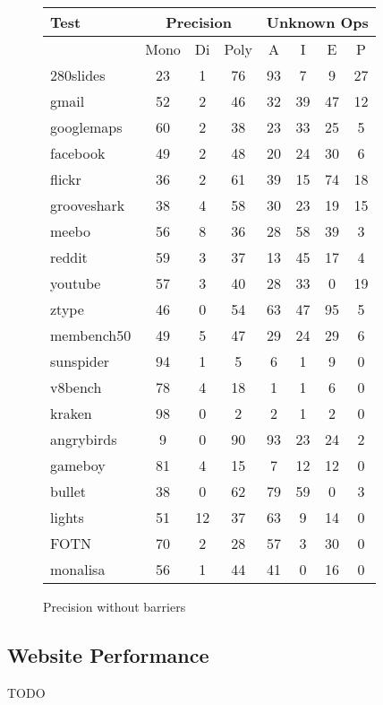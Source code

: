 \begin{figure}
\begin{center}
\begin{tabular}{|l|ccc|cccc|}
\hline
Test & \multicolumn{3}{|c|}{Precision}
     & \multicolumn{4}{|c|}{Unknown Ops} \\
\hline
     & Mono & Di & Poly & A & I & E & P \\
\hline
280slides      & 23 & 1 & 76 & 93 & 7 & 9 & 27 \\
gmail          & 52 & 2 & 46 & 32 & 39 & 47 & 12 \\
googlemaps     & 60 & 2 & 38 & 23 & 33 & 25 & 5 \\
facebook       & 49 & 2 & 48 & 20 & 24 & 30 & 6 \\
flickr         & 36 & 2 & 61 & 39 & 15 & 74 & 18 \\
grooveshark    & 38 & 4 & 58 & 30 & 23 & 19 & 15 \\
meebo          & 56 & 8 & 36 & 28 & 58 & 39 & 3 \\
reddit         & 59 & 3 & 37 & 13 & 45 & 17 & 4 \\
youtube        & 57 & 3 & 40 & 28 & 33 & 0 & 19 \\
ztype          & 46 & 0 & 54 & 63 & 47 & 95 & 5 \\
membench50     & 49 & 5 & 47 & 29 & 24 & 29 & 6 \\
sunspider      & 94 & 1 & 5 & 6 & 1 & 9 & 0 \\
v8bench        & 78 & 4 & 18 & 1 & 1 & 6 & 0 \\
kraken         & 98 & 0 & 2 & 2 & 1 & 2 & 0 \\
angrybirds     & 9 & 0 & 90 & 93 & 23 & 24 & 2 \\
gameboy        & 81 & 4 & 15 & 7 & 12 & 12 & 0 \\
bullet         & 38 & 0 & 62 & 79 & 59 & 0 & 3 \\
lights         & 51 & 12 & 37 & 63 & 9 & 14 & 0 \\
FOTN           & 70 & 2 & 28 & 57 & 3 & 30 & 0 \\
monalisa       & 56 & 1 & 44 & 41 & 0 & 16 & 0 \\
\hline
\end{tabular}
\end{center}
\caption{Precision without barriers}
\end{figure}

\subsection{Website Performance}

TODO

